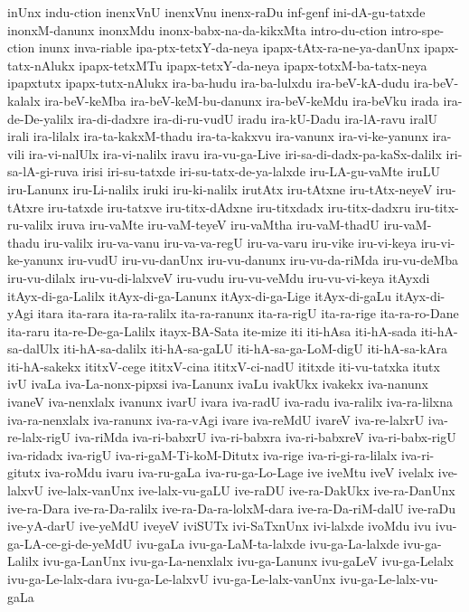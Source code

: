 {inUnx
indu-ction
inenxVnU
inenxVnu
inenx-raDu
inf-genf
ini-dA-gu-tatxde
inonxM-danunx
inonxMdu
inonx-babx-na-da-kikxMta
intro-du-ction
intro-spe-ction
inunx
inva-riable
ipa-ptx-tetxY-da-neya
ipapx-tAtx-ra-ne-ya-danUnx
ipapx-tatx-nAlukx
ipapx-tetxMTu
ipapx-tetxY-da-neya
ipapx-totxM-ba-tatx-neya
ipapxtutx
ipapx-tutx-nAlukx
ira-ba-hudu
ira-ba-lulxdu
ira-beV-kA-dudu
ira-beV-kalalx
ira-beV-keMba
ira-beV-keM-bu-danunx
ira-beV-keMdu
ira-beVku
irada
ira-de-De-yalilx
ira-di-dadxre
ira-di-ru-vudU
iradu
ira-kU-Dadu
ira-lA-ravu
iralU
irali
ira-lilalx
ira-ta-kakxM-thadu
ira-ta-kakxvu
ira-vanunx
ira-vi-ke-yanunx
ira-vili
ira-vi-nalUlx
ira-vi-nalilx
iravu
ira-vu-ga-Live
iri-sa-di-dadx-pa-kaSx-dalilx
iri-sa-lA-gi-ruva
irisi
iri-su-tatxde
iri-su-tatx-de-ya-lalxde
iru-LA-gu-vaMte
iruLU
iru-Lanunx
iru-Li-nalilx
iruki
iru-ki-nalilx
irutAtx
iru-tAtxne
iru-tAtx-neyeV
iru-tAtxre
iru-tatxde
iru-tatxve
iru-titx-dAdxne
iru-titxdadx
iru-titx-dadxru
iru-titx-ru-valilx
iruva
iru-vaMte
iru-vaM-teyeV
iru-vaMtha
iru-vaM-thadU
iru-vaM-thadu
iru-valilx
iru-va-vanu
iru-va-va-regU
iru-va-varu
iru-vike
iru-vi-keya
iru-vi-ke-yanunx
iru-vudU
iru-vu-danUnx
iru-vu-danunx
iru-vu-da-riMda
iru-vu-deMba
iru-vu-dilalx
iru-vu-di-lalxveV
iru-vudu
iru-vu-veMdu
iru-vu-vi-keya
itAyxdi
itAyx-di-ga-Lalilx
itAyx-di-ga-Lanunx
itAyx-di-ga-Lige
itAyx-di-gaLu
itAyx-di-yAgi
itara
ita-rara
ita-ra-ralilx
ita-ra-ranunx
ita-ra-rigU
ita-ra-rige
ita-ra-ro-Dane
ita-raru
ita-re-De-ga-Lalilx
itayx-BA-Sata
ite-mize
iti
iti-hAsa
iti-hA-sada
iti-hA-sa-dalUlx
iti-hA-sa-dalilx
iti-hA-sa-gaLU
iti-hA-sa-ga-LoM-digU
iti-hA-sa-kAra
iti-hA-sakekx
ititxV-cege
ititxV-cina
ititxV-ci-nadU
ititxde
iti-vu-tatxka
itutx
ivU
ivaLa
iva-La-nonx-pipxsi
iva-Lanunx
ivaLu
ivakUkx
ivakekx
iva-nanunx
ivaneV
iva-nenxlalx
ivanunx
ivarU
ivara
iva-radU
iva-radu
iva-ralilx
iva-ra-lilxna
iva-ra-nenxlalx
iva-ranunx
iva-ra-vAgi
ivare
iva-reMdU
ivareV
iva-re-lalxrU
iva-re-lalx-rigU
iva-riMda
iva-ri-babxrU
iva-ri-babxra
iva-ri-babxreV
iva-ri-babx-rigU
iva-ridadx
iva-rigU
iva-ri-gaM-Ti-koM-Ditutx
iva-rige
iva-ri-gi-ra-lilalx
iva-ri-gitutx
iva-roMdu
ivaru
iva-ru-gaLa
iva-ru-ga-Lo-Lage
ive
iveMtu
iveV
ivelalx
ive-lalxvU
ive-lalx-vanUnx
ive-lalx-vu-gaLU
ive-raDU
ive-ra-DakUkx
ive-ra-DanUnx
ive-ra-Dara
ive-ra-Da-ralilx
ive-ra-Da-ra-lolxM-dara
ive-ra-Da-riM-dalU
ive-raDu
ive-yA-darU
ive-yeMdU
iveyeV
iviSUTx
ivi-SaTxnUnx
ivi-lalxde
ivoMdu
ivu
ivu-ga-LA-ce-gi-de-yeMdU
ivu-gaLa
ivu-ga-LaM-ta-lalxde
ivu-ga-La-lalxde
ivu-ga-Lalilx
ivu-ga-LanUnx
ivu-ga-La-nenxlalx
ivu-ga-Lanunx
ivu-gaLeV
ivu-ga-Lelalx
ivu-ga-Le-lalx-dara
ivu-ga-Le-lalxvU
ivu-ga-Le-lalx-vanUnx
ivu-ga-Le-lalx-vu-gaLa
}
